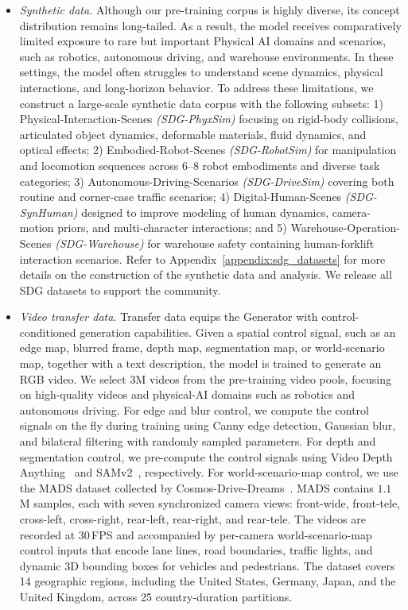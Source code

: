 \begin{itemize}
\item \textit{Synthetic data.} Although our pre-training corpus is highly diverse, its concept distribution remains long-tailed. As a result, the model receives comparatively limited exposure to rare but important Physical AI domains and scenarios, such as robotics, autonomous driving, and warehouse environments. In these settings, the model often struggles to understand scene dynamics, physical interactions, and long-horizon behavior. To address these limitations, we construct a large-scale synthetic data corpus with the following subsets: 1) Physical-Interaction-Scenes \textit{(SDG-PhyxSim)} focusing on rigid-body collisions, articulated object dynamics, deformable materials, fluid dynamics, and optical effects; 2) Embodied-Robot-Scenes \textit{(SDG-RobotSim)} for manipulation and locomotion sequences across 6--8 robot embodiments and diverse task categories; 3) Autonomous-Driving-Scenarios \textit{(SDG-DriveSim)} covering both routine and corner-case traffic scenarios; 4) Digital-Human-Scenes \textit{(SDG-SynHuman)} designed to improve modeling of human dynamics, camera-motion priors, and multi-character interactions; and 5) Warehouse-Operation-Scenes \textit{(SDG-Warehouse)} for warehouse safety containing human-forklift interaction scenarios. Refer to Appendix~\ref{appendix:sdg_datasets} for more details on the construction of the synthetic data and analysis. We release all SDG datasets to support the community.

\item \textit{Video transfer data.} Transfer data equips the Generator with control-conditioned generation capabilities. Given a spatial control signal, such as an edge map, blurred frame, depth map, segmentation map, or world-scenario map, together with a text description, the model is trained to generate an RGB video. We select $3$M videos from the pre-training video pools, focusing on high-quality videos and physical-AI domains such as robotics and autonomous driving. For edge and blur control, we compute the control signals on the fly during training using Canny edge detection, Gaussian blur, and bilateral filtering with randomly sampled parameters. For depth and segmentation control, we pre-compute the control signals using Video Depth Anything~\citep{chen2025videodepth} and SAMv2~\citep{ravi2024sam}, respectively. For world-scenario-map control, we use the MADS dataset collected by Cosmos-Drive-Dreams~\citep{ren2025cosmos}. MADS contains $1.1$M samples, each with seven synchronized camera views: front-wide, front-tele, cross-left, cross-right, rear-left, rear-right, and rear-tele. The videos are recorded at $30$\,FPS and accompanied by per-camera world-scenario-map control inputs that encode lane lines, road boundaries, traffic lights, and dynamic 3D bounding boxes for vehicles and pedestrians. The dataset covers 14 geographic regions, including the United States, Germany, Japan, and the United Kingdom, across 25 country-duration partitions.
\end{itemize}

